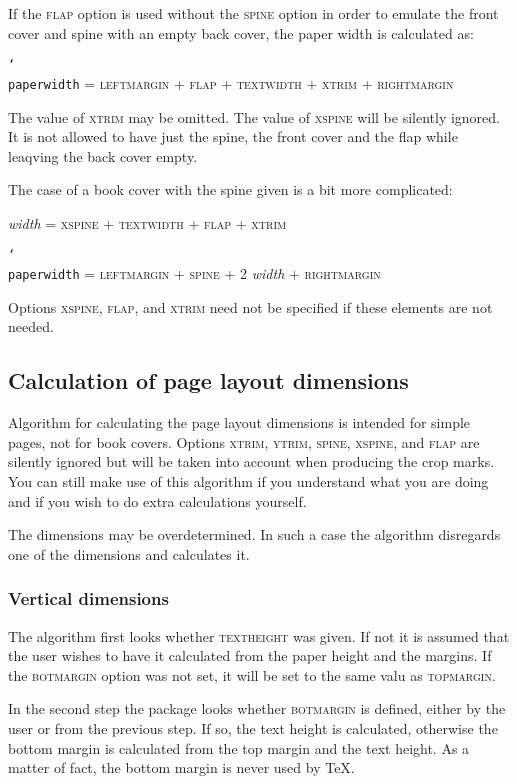 \documentclass[11pt]{article}
\def\opt#1{\texorpdfstring{\textmd{\textsc{#1}}}{#1}}
\DeclareRobustCommand\cmd[1]{\texttt{\char`\\#1}}
\begin{document}
\medskip
If the \opt{flap} option is used without the \opt{spine} option in order to emulate the front cover
and spine with an empty back cover, the paper width is calculated as:

\medskip
\cmd{paperwidth} = \opt{leftmargin} + \opt{flap} + \opt{textwidth} + \opt{xtrim} +
\opt{rightmargin}

\medskip \noindent
The value of \opt{xtrim} may be omitted. The value of \opt{xspine} will be silently ignored. It is
not allowed to have just the spine, the front cover and the flap while leaqving the back cover
empty.

The case of a book cover with the spine given is a bit more complicated:

\medskip
\textit{width} = \opt{xspine} + \opt{textwidth} + \opt{flap} + \opt{xtrim}

\cmd{paperwidth} = \opt{leftmargin} + \opt{spine} + 2 \textit{width} + \opt{rightmargin}

\medskip \noindent
Options \opt{xspine}, \opt{flap}, and \opt{xtrim} need not be specified if these elements are not
needed.

\subsection{Calculation of page layout dimensions}\label{calc.pg.layout}
Algorithm for calculating the page layout dimensions is intended for simple pages, not for book
covers. Options \opt{xtrim}, \opt{ytrim}, \opt{spine}, \opt{xspine}, and \opt{flap} are silently
ignored but will be taken into account when producing the crop marks. You can still make use of
this algorithm if you understand what you are doing and if you wish to do extra calculations
yourself.

The dimensions may be overdetermined. In such a case the algorithm disregards one of the dimensions
and calculates it.

\subsubsection{Vertical dimensions}\label{vert.dim}
The algorithm first looks whether \opt{textheight} was given. If not it is assumed that the user
wishes to have it calculated from the paper height and the margins. If the \opt{botmargin} option was
not set, it will be set to the same valu as \opt{topmargin}.

In the second step the package looks whether \opt{botmargin} is defined, either by the user or from
the previous step. If so, the text height is calculated, otherwise the bottom margin is calculated
from the top margin and the text height. As a matter of fact, the bottom margin is never used by
\TeX.
\end{document}
